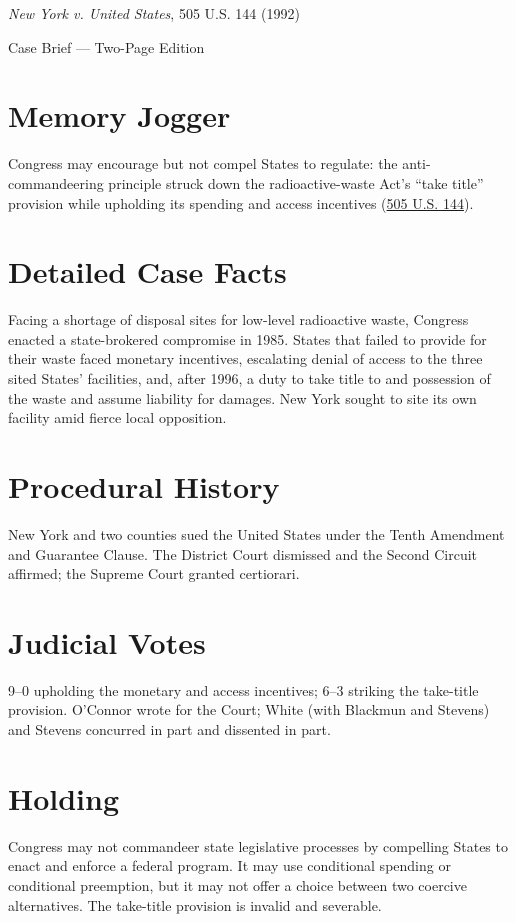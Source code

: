 \documentclass[12pt]{article}
\begin{document}
\begin{center}
{\LARGE \textit{New York v. United States}, 505 U.S. 144 (1992)\par}
\vspace{0.5em}
{\large Case Brief --- Two-Page Edition\par}
\end{center}

\section{Memory Jogger}
Congress may encourage but not compel States to regulate: the anti-commandeering principle struck down the radioactive-waste Act's ``take title'' provision while upholding its spending and access incentives (\href{https://www.courtlistener.com/opinion/112768/new-york-v-united-states/}{505 U.S. 144}).

\section{Detailed Case Facts}
Facing a shortage of disposal sites for low-level radioactive waste, Congress enacted a state-brokered compromise in 1985. States that failed to provide for their waste faced monetary incentives, escalating denial of access to the three sited States' facilities, and, after 1996, a duty to take title to and possession of the waste and assume liability for damages. New York sought to site its own facility amid fierce local opposition.

\section{Procedural History}
New York and two counties sued the United States under the Tenth Amendment and Guarantee Clause. The District Court dismissed and the Second Circuit affirmed; the Supreme Court granted certiorari.

\section{Judicial Votes}
9--0 upholding the monetary and access incentives; 6--3 striking the take-title provision. O'Connor wrote for the Court; White (with Blackmun and Stevens) and Stevens concurred in part and dissented in part.

\section{Holding}
Congress may not commandeer state legislative processes by compelling States to enact and enforce a federal program. It may use conditional spending or conditional preemption, but it may not offer a choice between two coercive alternatives. The take-title provision is invalid and severable.
\end{document}
